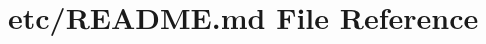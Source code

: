 \hypertarget{etc_2README_8md}{}\section{etc/\+R\+E\+A\+D\+ME.md File Reference}
\label{etc_2README_8md}
